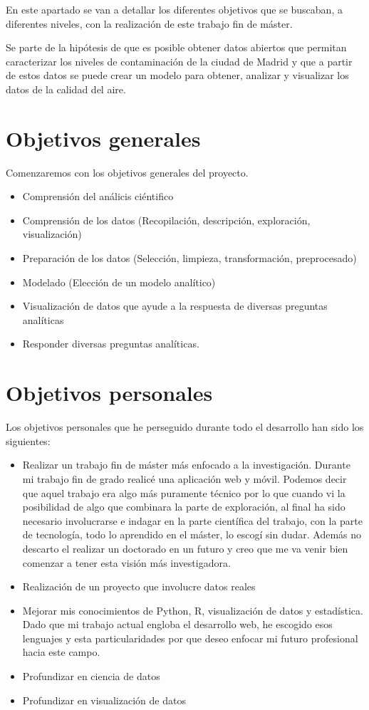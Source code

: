 
En este apartado se van a detallar los diferentes objetivos que se buscaban, a diferentes niveles, con la realización de este trabajo fin de máster.

Se parte de la hipótesis de que es posible obtener datos abiertos que permitan caracterizar  los niveles de contaminación de la ciudad de Madrid y que a partir de estos datos se puede crear un modelo para obtener, analizar y visualizar los datos 
de la calidad del aire.

\section{Objetivos generales}\label{objetivos-generales}
Comenzaremos con los objetivos generales del proyecto. 
\begin{itemize}
\tightlist
\item Comprensión del análicis ciéntifico
\item Comprensión de los datos (Recopilación, descripción, exploración, visualización)
\item Preparación de los datos (Selección, limpieza, transformación, preprocesado)
\item Modelado (Elección de un modelo analítico)
\item Visualización de datos que ayude a la respuesta de diversas preguntas analíticas
\item
  Responder diversas preguntas analíticas.  
\end{itemize}

\section{Objetivos personales}\label{objetivos-personales}
Los objetivos personales que he perseguido durante todo el desarrollo han sido los siguientes:
\begin{itemize}
\tightlist
\item
 Realizar un trabajo fin de máster más enfocado a la investigación. Durante mi trabajo fin de grado realicé una aplicación web y móvil. Podemos decir que aquel trabajo era algo más puramente técnico por lo que cuando vi la posibilidad de algo que combinara la parte de exploración, al final ha sido necesario involucrarse e indagar en la parte científica del trabajo, con la parte de tecnología, todo lo aprendido en el máster, lo escogí sin dudar. Además no descarto el realizar un doctorado en un futuro y creo que me va venir bien comenzar a tener esta visión más investigadora.
 \item
 Realización de un proyecto que involucre datos reales
\item
  Mejorar mis conocimientos de Python, R, visualización de datos y estadística. Dado que mi trabajo actual engloba el desarrollo web, he escogido esos lenguajes y esta particularidades por que deseo enfocar mi futuro profesional hacia este campo.
   \item Profundizar en ciencia de datos
  \item Profundizar en visualización de datos
\end{itemize}

